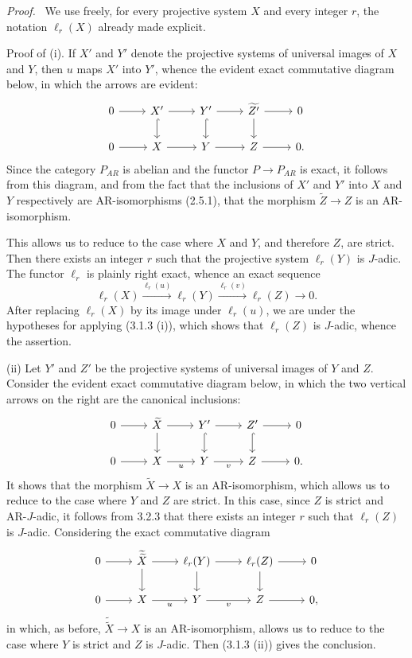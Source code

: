 \documentclass[11pt]{article}
\newenvironment{prooftext}[1][Proof]{\par\noindent\emph{#1.}\ }{\par\medskip}
\begin{document}
\begin{prooftext}[Proof]
We use freely, for every projective system $X$ and every integer $r$, the notation $\ell_r(X)$ already made explicit.

Proof of (i). If $X'$ and $Y'$ denote the projective systems of universal images of $X$ and $Y$, then $u$ maps $X'$ into $Y'$, whence the evident exact commutative diagram below, in which the arrows are evident:
\[
\begin{tikzcd}
0 \arrow[r] & X' \arrow[r] \arrow[d,hook] & Y' \arrow[r] \arrow[d,hook] & \widetilde{Z'} \arrow[r] \arrow[d] & 0\\
0 \arrow[r] & X \arrow[r] & Y \arrow[r] & Z \arrow[r] & 0 .
\end{tikzcd}
\]
Since the category $P_{AR}$ is abelian and the functor $P\to P_{AR}$ is exact, it follows from this diagram, and from the fact that the inclusions of $X'$ and $Y'$ into $X$ and $Y$ respectively are AR-isomorphisms (2.5.1), that the morphism $\widetilde Z\to Z$ is an AR-isomorphism.

This allows us to reduce to the case where $X$ and $Y$, and therefore $Z$, are strict. Then there exists an integer $r$ such that the projective system $\ell_r(Y)$ is $J$-adic. The functor $\ell_r$ is plainly right exact, whence an exact sequence
\[
\ell_r(X)\stackrel{\ell_r(u)}{\longrightarrow}\ell_r(Y)\stackrel{\ell_r(v)}{\longrightarrow}\ell_r(Z)\longrightarrow0.
\]
After replacing $\ell_r(X)$ by its image under $\ell_r(u)$, we are under the hypotheses for applying (3.1.3 (i)), which shows that $\ell_r(Z)$ is $J$-adic, whence the assertion.

(ii) Let $Y'$ and $Z'$ be the projective systems of universal images of $Y$ and $Z$. Consider the evident exact commutative diagram below, in which the two vertical arrows on the right are the canonical inclusions:
\[
\begin{tikzcd}
0 \arrow[r] & \widetilde X \arrow[r] \arrow[d] & Y' \arrow[r] \arrow[d,hook] & Z' \arrow[r] \arrow[d,hook] & 0\\
0 \arrow[r] & X \arrow[r,"u"'] & Y \arrow[r,"v"'] & Z \arrow[r] & 0 .
\end{tikzcd}
\]
It shows that the morphism $\widetilde X\to X$ is an AR-isomorphism, which allows us to reduce to the case where $Y$ and $Z$ are strict. In this case, since $Z$ is strict and AR-$J$-adic, it follows from 3.2.3 that there exists an integer $r$ such that $\ell_r(Z)$ is $J$-adic. Considering the exact commutative diagram
\[
\begin{tikzcd}
0 \arrow[r] & \widetilde{\widetilde X} \arrow[r] \arrow[d] & \ell_r(Y) \arrow[r] \arrow[d] & \ell_r(Z) \arrow[r] \arrow[d] & 0\\
0 \arrow[r] & X \arrow[r,"u"'] & Y \arrow[r,"v"'] & Z \arrow[r] & 0,
\end{tikzcd}
\]
in which, as before, $\widetilde{\widetilde X}\to X$ is an AR-isomorphism, allows us to reduce to the case where $Y$ is strict and $Z$ is $J$-adic. Then (3.1.3 (ii)) gives the conclusion.
\end{prooftext}
\end{document}

